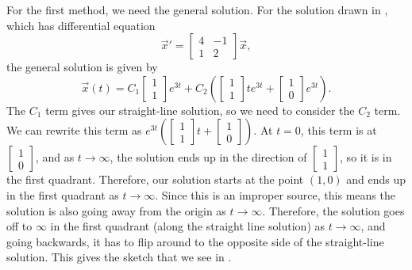 For the first method, we need the general solution. For the solution drawn in , which has differential equation \[ {\vec{x}}' = \begin{bmatrix} 4 & -1 \\ 1 & 2 \end{bmatrix} \vec{x},\] the general solution is given by \[ \vec{x}(t) = C_1 \begin{bmatrix} 1 \\ 1 \end{bmatrix}e^{3t} + C_2\left( \begin{bmatrix} 1 \\ 1 \end{bmatrix}te^{3t} + \begin{bmatrix} 1 \\ 0 \end{bmatrix}e^{3t}\right). \] The $C_1$ term gives our straight-line solution, so we need to consider the $C_2$ term. We can rewrite this term as $e^{3t}\left(\left[\begin{smallmatrix} 1 \\ 1 \end{smallmatrix}\right]t + \left[\begin{smallmatrix} 1 \\ 0 \end{smallmatrix}\right] \right)$. At $t=0$, this term is at $\left[\begin{smallmatrix} 1 \\ 0 \end{smallmatrix}\right]$, and as $t \rightarrow \infty$, the solution ends up in the direction of $\left[\begin{smallmatrix} 1 \\ 1 \end{smallmatrix}\right]$, so it is in the first quadrant. Therefore, our solution starts at the point $(1,0)$ and ends up in the first quadrant as $t \rightarrow \infty$. Since this is an improper source, this means the solution is also going away from the origin as $t \rightarrow \infty$. Therefore, the solution goes off to $\infty$ in the first quadrant (along the straight line solution) as $t\rightarrow \infty$, and going backwards, it has to flip around to the opposite side of the straight-line solution. This gives the sketch that we see in .

